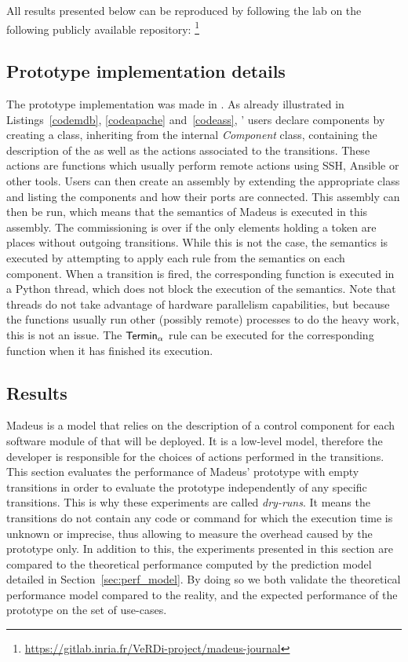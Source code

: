 All results presented below can be reproduced by following the lab on
the following publicly available repository:
\footnote{\url{https://gitlab.inria.fr/VeRDi-project/madeus-journal}}

\subsection{Prototype implementation details}
The prototype implementation was made in \python. As already
illustrated in Listings~\ref{codemdb}, \ref{codeapache}
and~\ref{codeass}, \mad' users declare components by creating a class,
inheriting from the internal \emph{Component} class, containing the
description of the \net as well as the actions associated to the
transitions. These actions are \python functions which usually perform
remote actions using SSH, Ansible or other tools. Users can then
create an assembly by extending the appropriate class and listing the
components and how their ports are connected. This assembly can then
be run, which means that the semantics of Madeus is executed in this
assembly. The commissioning is over if the only elements holding a
token are places without outgoing transitions. While this is not the
case, the semantics is executed by attempting to apply each rule from
the semantics on each component. When a transition is fired, the
corresponding \python function is executed in a Python thread, which
does not block the execution of the semantics. Note that \python
threads do not take advantage of hardware parallelism capabilities,
but because the functions usually run other (possibly remote)
processes to do the heavy work, this is not an issue. The
$\mathsf{Termin}_\alpha$ rule can be executed for the corresponding function
when it has finished its execution.

\subsection{Results}

Madeus is a model that relies on the description of a control
component for each software module of that will be deployed. It is a
low-level model, therefore the developer is responsible for the
choices of actions performed in the transitions.  This section
evaluates the performance of Madeus' prototype with empty transitions
in order to evaluate the \mad prototype independently of any specific
transitions. This is why these experiments are called
\emph{dry-runs}. It means the transitions do not contain any code or
command for which the execution time is unknown or imprecise, thus
allowing to measure the overhead caused by the prototype only. In
addition to this, the experiments presented in this section are
compared to the theoretical performance computed by the prediction
model detailed in Section~\ref{sec:perf_model}. By doing so we both
validate the theoretical performance model compared to the reality,
and the expected performance of the prototype on the set of use-cases.

